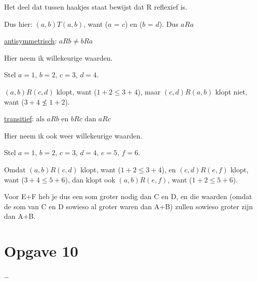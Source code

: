 \documentclass[11pt, a4paper]{article}
\begin{document}
Het deel dat tussen haakjes staat bewijst dat R reflexief is. 

Dus hier: $(a,b)T(a,b)$, want ($a$ = $c$) en ($b$ = $d$). Dus $aRa$


\underline{antisymmetrisch}:
$aRb \neq bRa$

Hier neem ik willekeurige waarden.

Stel $a = 1$, $b = 2$, $c = 3$, $d = 4$.

$(a,b)R(c,d)$ klopt, want ($1+2 \le 3+4$), maar $(c,d)R(a,b)$ klopt niet, want ($3+4 \not\le 1+2$).


\underline{transitief}:
$\text{als } aRb \text{ en } bRc \text{ dan } aRc$

Hier neem ik ook weer willekeurige waarden.

Stel $a = 1$, $b = 2$, $c = 3$, $d = 4$, $e = 5$, $f = 6$.

Omdat $(a,b)R(c,d)$ klopt, want ($1+2 \le 3+4$), en $(c,d)R(e,f)$ klopt, want ($3+4 \le 5+6$), dan klopt ook $(a,b)R(e,f)$, want ($1+2 \le 5+6$).

Voor E+F heb je dus een som groter nodig dan C en D, en die waarden (omdat de som van C en D sowieso al groter waren dan A+B) zullen sowieso groter zijn dan A+B.


\pagebreak
\section*{Opgave 10}
\ldots
\end{document}
